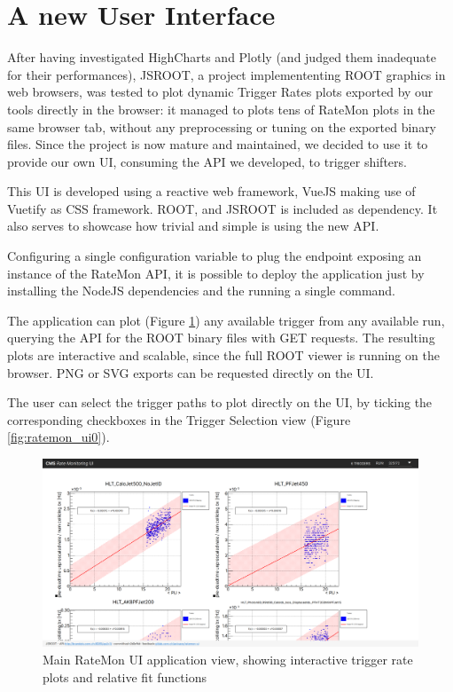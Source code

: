 \section{A new User Interface}

After having investigated HighCharts and Plotly (and judged them inadequate for their performances), JSROOT, a project implemententing ROOT graphics in web browsers, was tested to plot dynamic Trigger Rates plots exported by our tools directly in the browser: it managed to plots tens of RateMon plots in the same browser tab, without any preprocessing or tuning on the exported binary files. Since the project is now mature and maintained, we decided to use it to provide our own UI, consuming the API we developed, to trigger shifters.

This UI is developed using a reactive web framework, VueJS \cite{Vuejs-2020-10-04} making use of Vuetify \cite{VuetifyAMaterialDesignFrameworkforVuejs-2020-10-04} as CSS framework. ROOT, and JSROOT \cite{JavaScriptROOT-2020-05-07} is included as dependency. It also serves to showcase how trivial and simple is using the new API.

Configuring a single configuration variable to plug the endpoint exposing an instance of the RateMon API, it is possible to deploy the application just by installing the NodeJS dependencies and the running a single  command.

The application can plot (Figure \ref{fig:ratemon_ui1}) any available trigger from any available run, querying the API for the ROOT binary files with GET requests. The resulting plots are interactive and scalable, since the full ROOT viewer is running on the browser. PNG or SVG exports can be requested directly on the UI.

The user can select the trigger paths to plot directly on the UI, by ticking the corresponding checkboxes in the Trigger Selection view (Figure \ref{fig:ratemon_ui0}).

\begin{figure}
    \centerline{
        \includegraphics[width=0.9\paperwidth]{figures/ratemon-ui0.png}}
    \caption{Main RateMon UI application view, showing interactive trigger rate plots and relative fit functions}
    \label{fig:ratemon_ui1}
\end{figure}

